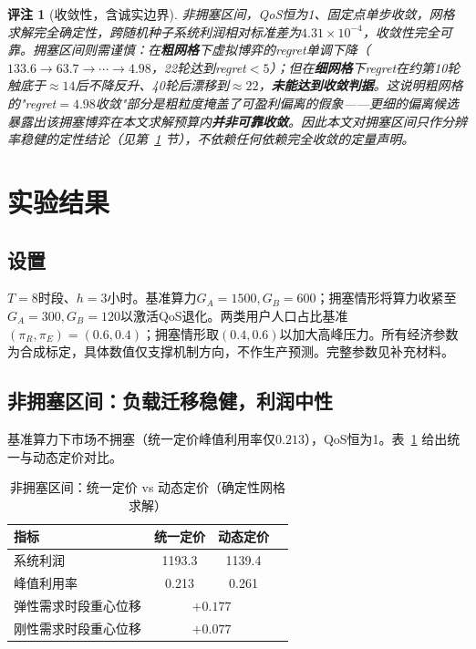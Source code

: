 \documentclass[UTF8,11pt]{ctexart}
\newtheorem{remark}{评注}
\begin{document}
\begin{remark}[收敛性，含诚实边界]
非拥塞区间，QoS恒为1、固定点单步收敛，网格求解完全确定性，跨随机种子系统利润相对标准差为$4.31\times10^{-4}$，收敛性完全可靠。拥塞区间则需谨慎：在\textbf{粗网格}下虚拟博弈的regret单调下降（$133.6\to63.7\to\cdots\to4.98$，22轮达到regret$<5$）；但在\textbf{细网格}下regret在约第10轮触底于$\approx14$后不降反升、40轮后漂移到$\approx22$，\textbf{未能达到收敛判据}。这说明粗网格的"regret$=4.98$收敛"部分是粗粒度掩盖了可盈利偏离的假象——更细的偏离候选暴露出该拥塞博弈在本文求解预算内\textbf{并非可靠收敛}。因此本文对拥塞区间只作分辨率稳健的定性结论（见第~\ref{sec:results} 节），不依赖任何依赖完全收敛的定量声明。
\end{remark}

\section{实验结果}
\label{sec:results}

\subsection{设置}

$T=8$时段、$h=3$小时。基准算力$G_A=1500,G_B=600$；拥塞情形将算力收紧至$G_A=300,G_B=120$以激活QoS退化。两类用户人口占比基准$(\pi_R,\pi_E)=(0.6,0.4)$；拥塞情形取$(0.4,0.6)$以加大高峰压力。所有经济参数为合成标定，具体数值仅支撑机制方向，不作生产预测。完整参数见补充材料。

\subsection{非拥塞区间：负载迁移稳健，利润中性}

基准算力下市场不拥塞（统一定价峰值利用率仅$0.213$），QoS恒为1。表~\ref{tab:uncongested} 给出统一与动态定价对比。

\begin{table}[H]
\centering
\caption{非拥塞区间：统一定价 vs 动态定价（确定性网格求解）}
\label{tab:uncongested}
\begin{tabular}{lccc}
\toprule
指标 & 统一定价 & 动态定价 \\
\midrule
系统利润 & 1193.3 & 1139.4 \\
峰值利用率 & 0.213 & 0.261 \\
弹性需求时段重心位移 & \multicolumn{2}{c}{$+0.177$} \\
刚性需求时段重心位移 & \multicolumn{2}{c}{$+0.077$} \\
\bottomrule
\end{tabular}
\end{table}
\end{document}
